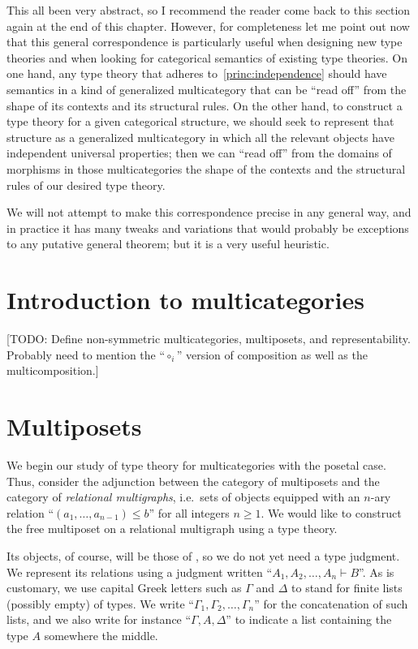 \documentclass{book}
\let\types\vdash
\begin{document}
This all been very abstract, so I recommend the reader come back to this section again at the end of this chapter.
However, for completeness let me point out now that this general correspondence is particularly useful when designing new type theories and when looking for categorical semantics of existing type theories.
On one hand, any type theory that adheres to~\eqref{princ:independence} should have semantics in a kind of generalized multicategory that can be ``read off'' from the shape of its contexts and its structural rules.
On the other hand, to construct a type theory for a given categorical structure, we should seek to represent that structure as a generalized multicategory in which all the relevant objects have independent universal properties; then we can ``read off'' from the domains of morphisms in those multicategories the shape of the contexts and the structural rules of our desired type theory.

We will not attempt to make this correspondence precise in any general way, and in practice it has many tweaks and variations that would probably be exceptions to any putative general theorem; but it is a very useful heuristic.


\section{Introduction to multicategories}
\label{sec:multicats-catth}

[TODO: Define non-symmetric multicategories, multiposets, and representability.
Probably need to mention the ``$\circ_i$'' version of composition as well as the multicomposition.]


\section{Multiposets}
\label{sec:multiposets}

We begin our study of type theory for multicategories with the posetal case.
Thus, consider the adjunction between the category \bMPos of multiposets and the category \bRelMGr of \emph{relational multigraphs}, i.e.\ sets of objects equipped with an $n$-ary relation ``$(a_1,\dots,a_{n-1})\le b$'' for all integers $n\ge 1$.
We would like to construct the free multiposet on a relational multigraph \cG using a type theory.

Its objects, of course, will be those of \cG, so we do not yet need a type judgment.
We represent its relations using a judgment written ``$A_1,A_2,\dots,A_n \types B$''.
As is customary, we use capital Greek letters such as $\Gamma$ and $\Delta$ to stand for finite lists (possibly empty) of types.
We write ``$\Gamma_1,\Gamma_2,\dots,\Gamma_n$'' for the concatenation of such lists, and we also write for instance ``$\Gamma,A,\Delta$'' to indicate a list containing the type $A$ somewhere the middle.
\end{document}
